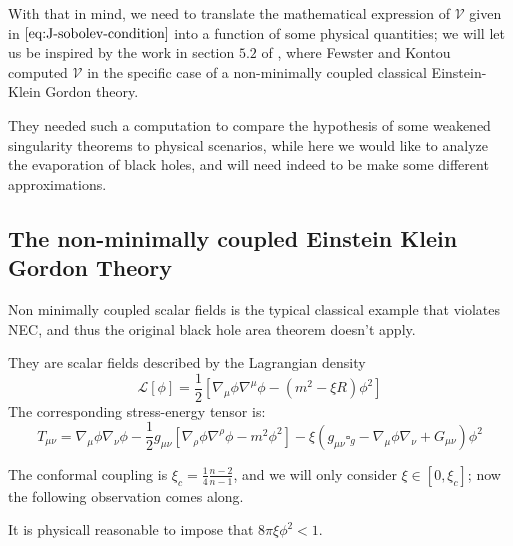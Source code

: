 With that in mind, we need to translate the mathematical expression of \(\mathcal{V}\) given in \(\eqref{eq:J-sobolev-condition}\) into a function of some physical quantities; we will let us be inspired by the work in section \(5.2\) of \cite*{fewster2020new}, where Fewster and Kontou computed \(\mathcal{V}\) in the specific case of a non-minimally coupled classical Einstein-Klein Gordon theory.

They needed such a computation to compare the hypothesis of some weakened singularity theorems to physical scenarios, while here we would like to analyze the evaporation of black holes, and will need indeed to be make some different approximations.

\subsection{The non-minimally coupled Einstein Klein Gordon Theory}
Non minimally coupled scalar fields is the typical classical example that violates NEC, and thus the original black hole area theorem doesn't apply. 

They are scalar fields described by the Lagrangian density
\[
\mathcal{L}[\phi] = \frac{1}{2}\left[\nabla_{\mu}\phi\nabla^{\mu}\phi   - (m^2 - \xi R)\phi^2\right]
\]
The corresponding stress-energy tensor is:
\begin{equation}
    T_{\mu\nu} = \nabla_{\mu}\phi\nabla_{\nu}\phi - \frac{1}{2}g_{\mu\nu}\left[\nabla_{\rho}\phi\nabla^{\rho}\phi - m^2\phi^2\right] - \xi\left(g_{\mu\nu}\square_g - \nabla_{\mu}\phi\nabla_{\nu} + G_{\mu\nu}\right)\phi^2
\end{equation}

The conformal coupling is \(\xi_c = \frac{1}{4}\frac{n - 2}{n - 1}\), and we will only consider \(\xi\in [0,\xi_c]\); 
now the following observation comes along.

\begin{prop}
    It is physicall reasonable to impose that \(8\pi\xi\phi^2 < 1\).
\end{prop}

